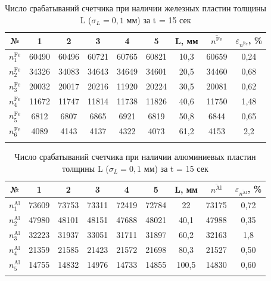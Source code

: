 \documentclass[a4paper, 12pt]{article}%
\begin{document}
\begin{enumerate}
	
	\begin{longtable}{|c|c|c|c|c|c|c|c|c|}
		\hline
		№ & 1 & 2 & 3 & 4 & 5 & L, мм & $\overline{n^{\text{Fe}}}$& $\varepsilon_{\overline{n^{\text{Fe}}}}$, \% \\ \hline
		$n_{1}^{\text{Fe}}$ & 60490 & 60496 & 60721 & 60765 & 60821 & 10,3 & 60659 & 0,24\\ \hline
		$n_{2}^{\text{Fe}}$ & 34326 & 34083 & 34643 & 34649 & 34601 & 20,5 & 34460 & 0,68 \\ \hline
		$n_{3}^{\text{Fe}}$ & 20032 & 20017 & 20216 & 11920 & 20224 & 30,5 & 20081 & 0,62\\ \hline
		$n_{4}^{\text{Fe}}$ & 11672 & 11747 & 11814 & 11738 & 11826 & 40,6 & 11750 & 1,48\\ \hline
		$n_{5}^{\text{Fe}}$ & 6812 & 6807 & 6865 & 6921 & 6819 & 50,8 & 6844 & 0,65\\ 
		\hline
		$n_{6}^{\text{Fe}}$ & 4089 & 4143 & 4137 & 4322 & 4073 & 61,2 & 4153 & 2,2\\
		\hline
		\caption{Число срабатываний счетчика при наличии железных  пластин толщины L ($\sigma_L = 0,1$ мм) за t = 15 сек}
	\end{longtable}

	\begin{longtable}{|c|c|c|c|c|c|c|c|c|}
		\hline
		№ & 1 & 2 & 3 & 4 & 5 & L, мм & $\overline{n^{\text{Al}}}$ & $\varepsilon_{\overline{n^{\text{Al}}}}$, \%\\ \hline
		$n_{1}^{\text{Al}}$ & 73609 & 73753 & 73311 & 72419 & 72784 & 22 & 73175 & 0,72\\ \hline
		$n_{2}^{\text{Al}}$ & 47980 & 48101 & 48151 & 47688 & 48021 & 40,1 & 47988 & 0,35\\ \hline
		$n_{3}^{\text{Al}}$ & 32223 & 31937 & 33051 & 31711 & 31897 & 60,2 & 32163 & 1,8\\ \hline
		$n_{4}^{\text{Al}}$ & 21359 & 21585 & 21423 & 21572 & 21698 & 80,3 & 21527 & 0,50\\ \hline
		$n_{5}^{\text{Al}}$ & 14755 & 14832 & 14976 & 14733 & 14855 & 
		100,5 & 14830 & 0,60\\ 
		\hline
		\caption{Число срабатываний счетчика при наличии алюминиевых  пластин толщины L ($\sigma_L = 0,1$ мм) за t = 15 сек}
	\end{longtable}

\newpage
	

\end{enumerate}
\end{document}
